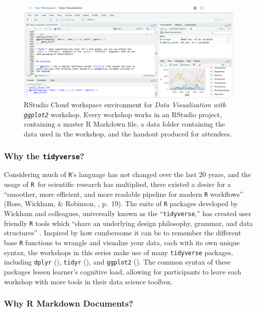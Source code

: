 \documentclass[12pt]{article}
\newcommand{\R}{\texttt{R}}
\begin{document}
\begin{figure}[t!]
    \centering
    \includegraphics[width = \textwidth]{images/cloud_bigger_plot_blind.png}
    \caption{RStudio Cloud workspace environment for \emph{Data Visualization
    with \texttt{ggplot2}} workshop. Every workshop works in an RStudio project,
    containing a master R Markdown file, a data folder containing the
    data used in the workshop, and the handout produced for attendees.} 
    \label{fig:cloud}
\end{figure}

\subsubsection{Why the \texttt{tidyverse}?}

\noindent Considering much of \texttt{R}'s language has not changed over the 
last 20 years, and the usage of \R~for scientific research has multiplied, there
existed a desire for a ``smoother, more efficient, and more readable pipeline
for modern \texttt{R} workflows'' (Ross, Wickham, \& Robinson, 
\citeyear{tidytools}, p.\ 19). The suite of \texttt{R} packages developed by 
Wickham and colleagues, universally known as the ``\texttt{tidyverse},'' has 
created user friendly \texttt{R} tools which ``share an underlying design
philosophy, grammar, and data structures'' \citep{tidyverse}. Inspired by how
cumbersome it can be to remember the different base \texttt{R} functions to
wrangle and visualize your data, each with its own unique syntax, the workshops
in this series make use of many \texttt{tidyverse} packages, including 
\texttt{dplyr} (\citeyear{dplyr}), \texttt{tidyr} (\citeyear{tidyr}), and 
\texttt{ggplot2} (\citeyear{ggplot}). The common syntax of these packages lessen
learner's cognitive load, allowing for participants to leave each workshop with
more tools in their data science toolbox. 


\subsubsection{Why R Markdown Documents?}
\end{document}
